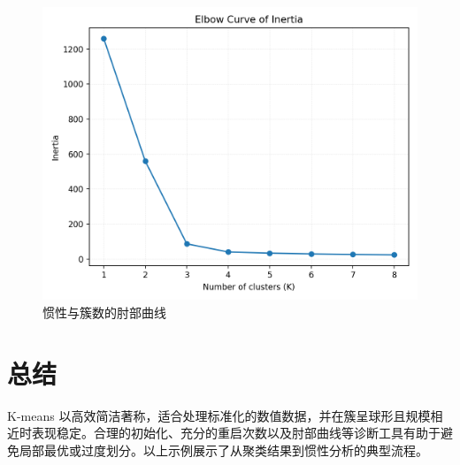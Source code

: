 \documentclass[UTF8,zihao=-4]{ctexart}
\begin{document}
\begin{figure}[H]
  \centering
  \includegraphics[width=0.82\linewidth]{kmeans_elbow.png}
  \caption{惯性与簇数的肘部曲线}
  \label{fig:kmeans_elbow_cn}
\end{figure}

\FloatBarrier
\section{总结}
K-means 以高效简洁著称，适合处理标准化的数值数据，并在簇呈球形且规模相近时表现稳定。合理的初始化、充分的重启次数以及肘部曲线等诊断工具有助于避免局部最优或过度划分。以上示例展示了从聚类结果到惯性分析的典型流程。
\end{document}
